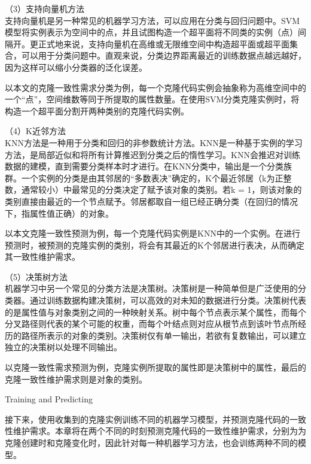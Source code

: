 （3）支持向量机方法\\
支持向量机是另一种常见的机器学习方法，可以应用在分类与回归问题中。SVM模型将实例表示为空间中的点，并且试图构造一个超平面将不同类的实例（点）间隔开。更正式地来说，支持向量机在高维或无限维空间中构造超平面或超平面集合，可以用于分类问题中。直观来说，分类边界距离最近的训练数据点越远越好，因为这样可以缩小分类器的泛化误差。

以本文的克隆一致性需求分类为例，每一个克隆代码实例会抽象称为高维空间中的一个“点”，空间维数等同于所提取的属性数量。在使用SVM分类克隆实例时，将构造一个超平面分割开两种类别的克隆代码实例。

（4）K近邻方法\\
KNN方法是一种用于分类和回归的非参数统计方法。KNN是一种基于实例的学习方法，是局部近似和将所有计算推迟到分类之后的惰性学习。KNN会推迟对训练数据的建模，直到需要分类样本时才进行。在KNN分类中，输出是一个分类族群。一个实例的分类是由其邻居的“多数表决”确定的，K个最近邻居（k为正整数，通常较小）中最常见的分类决定了赋予该对象的类别。若k = 1，则该对象的类别直接由最近的一个节点赋予。邻居都取自一组已经正确分类（在回归的情况下，指属性值正确）的对象。

以本文克隆一致性预测为例，每一个克隆代码实例是KNN中的一个实例。在进行预测时，被预测的克隆实例的类别，将会有其最近的K个邻居进行表决，从而确定其一致性维护需求。

（5）决策树方法\\
机器学习中另一个常见的分类方法是决策树。决策树是一种简单但是广泛使用的分类器。通过训练数据构建决策树，可以高效的对未知的数据进行分类。决策树代表的是属性值与对象类别之间的一种映射关系。树中每个节点表示某个属性，而每个分叉路径则代表的某个可能的权重，而每个叶结点则对应从根节点到该叶节点所经历的路径所表示的对象的类别。决策树仅有单一输出，若欲有复数输出，可以建立独立的决策树以处理不同输出。

 以克隆一致性需求预测为例，克隆实例所提取的属性即是决策树中的属性，最后的克隆一致性维护需求则是对象的类别。

{Training and Predicting}

接下来，使用收集到的克隆实例训练不同的机器学习模型，并预测克隆代码的一致性维护需求。本章将在两个不同的时刻预测克隆代码的一致性维护需求，分别为为克隆创建时和克隆变化时，因此针对每一种机器学习方法，也会训练两种不同的模型。

